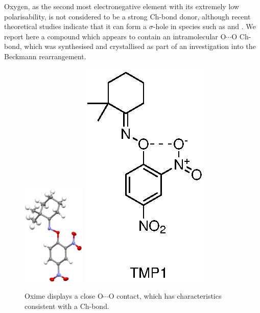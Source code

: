 \begin{refsection}
Oxygen, as the second most electronegative element with its extremely low polarisability, is not considered to be a strong Ch-bond donor, although recent theoretical studies indicate that it can form a $\sigma$-hole in species such as  and .\autocite{Varadwaj2019a,Varadwaj2019} 
We report here a compound which appears to contain an intramolecular O$\cdots$O Ch-bond, which was synthesised and crystallised as part of an investigation into the Beckmann rearrangement.\autocite{Yeoh2012}

\begin{figure}
\centering
\includegraphics[width=3cm]{Figures/dimethylcyclohexanone-oxime-dnp-xray.pdf}
\hspace{0.5cm}
\includegraphics[scale=0.8]{Figures/dimethylcyclohexanone-oxime-dnp.eps}	
\caption{Oxime  displays a close O$\cdots$O contact, which has characteristics consistent with a Ch-bond.}
\label{fig:dimethylcyclohexanone-oxime-dn}
\end{figure}


\end{refsection}
